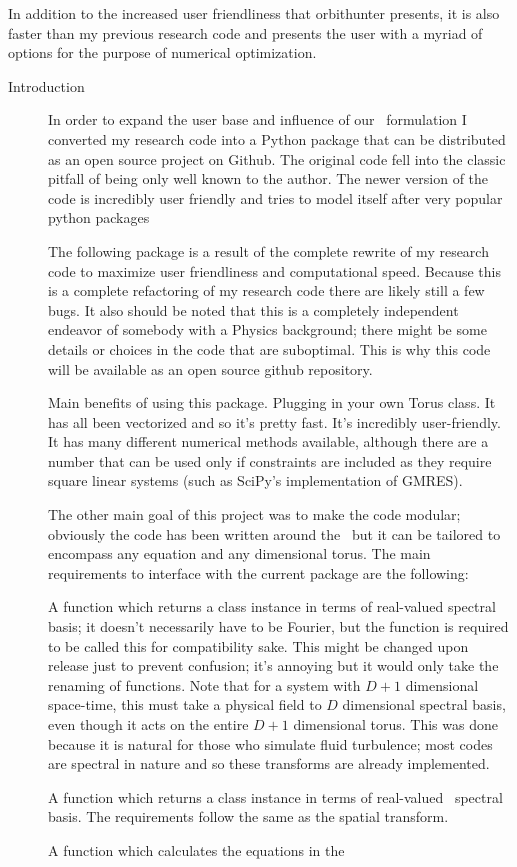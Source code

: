 In addition to the increased user friendliness that orbithunter presents, it is also faster than my previous research code
and presents the user with a myriad of options for the purpose of numerical optimization.


\begin{description}
\item[Introduction]
In order to expand the user base and influence of our \spt\ formulation
I converted my research code into a Python package that can be distributed
as an open source project on Github. The original code fell into the classic
pitfall of being only well known to the author. The newer version of the code
is incredibly user friendly and tries to model itself after very popular
python packages

The following package is a result of the complete rewrite of my
research code to maximize user friendliness and computational speed.
Because this is a complete refactoring of my research code there
are likely still a few bugs. It also should be noted that this is
a completely independent endeavor of somebody with a Physics background;
there might be some details or choices in the code that are suboptimal.
This is why this code will be available as an open source github repository.

Main benefits of using this package. Plugging in your own Torus class.
It has all been vectorized and so it's pretty fast. It's incredibly user-friendly.
It has many different numerical methods available, although there are
a number that can be used only if constraints are included as they
require square linear systems (such as SciPy's implementation of GMRES).

The other main goal of this project was to make the code modular; obviously
the code has been written around the \KSe\ but it can be tailored to
encompass any equation and any dimensional torus. The main
requirements to interface with the current package are the
following:

A function which returns a class instance in terms of real-valued spectral basis; it doesn't
necessarily have to be Fourier, but the function is required to be called this for compatibility sake.
This might be changed upon release just to prevent confusion; it's annoying but it would only
take the renaming of functions. Note that for a system with $D+1$ dimensional space-time, this
must take a physical field to $D$ dimensional spectral basis, even though it acts on the entire
$D+1$ dimensional torus. This was done because it is natural for those who simulate fluid turbulence;
most codes are spectral in nature and so these transforms are already implemented.

A function which returns a class instance in terms of real-valued \spt\ spectral basis. The requirements
follow the same as the spatial transform.

A function which calculates the equations in the \spt\ \Fcs\

\end{description}
